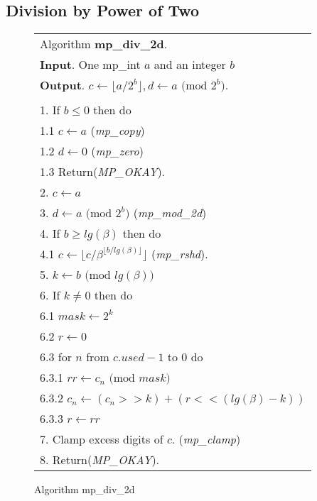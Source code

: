\documentclass[b5paper]{book}
\begin{document}
\subsection{Division by Power of Two}

\newpage\begin{figure}[!here]
\begin{small}
\begin{center}
\begin{tabular}{l}
\hline Algorithm \textbf{mp\_div\_2d}. \\
\textbf{Input}.   One mp\_int $a$ and an integer $b$ \\
\textbf{Output}.  $c \leftarrow \lfloor a / 2^b \rfloor, d \leftarrow a \mbox{ (mod }2^b\mbox{)}$. \\
\hline \\
1.  If $b \le 0$ then do \\
\hspace{3mm}1.1  $c \leftarrow a$ (\textit{mp\_copy}) \\
\hspace{3mm}1.2  $d \leftarrow 0$ (\textit{mp\_zero}) \\
\hspace{3mm}1.3  Return(\textit{MP\_OKAY}). \\
2.  $c \leftarrow a$ \\
3.  $d \leftarrow a \mbox{ (mod }2^b\mbox{)}$ (\textit{mp\_mod\_2d}) \\
4.  If $b \ge lg(\beta)$ then do \\
\hspace{3mm}4.1  $c \leftarrow \lfloor c/\beta^{\lfloor b/lg(\beta) \rfloor} \rfloor$ (\textit{mp\_rshd}). \\
5.  $k \leftarrow b \mbox{ (mod }lg(\beta)\mbox{)}$ \\
6.  If $k \ne 0$ then do \\
\hspace{3mm}6.1  $mask \leftarrow 2^k$ \\
\hspace{3mm}6.2  $r \leftarrow 0$ \\
\hspace{3mm}6.3  for $n$ from $c.used - 1$ to $0$ do \\
\hspace{6mm}6.3.1  $rr \leftarrow c_n \mbox{ (mod }mask\mbox{)}$ \\
\hspace{6mm}6.3.2  $c_n \leftarrow (c_n >> k) + (r << (lg(\beta) - k))$ \\
\hspace{6mm}6.3.3  $r \leftarrow rr$ \\
7.  Clamp excess digits of $c$.  (\textit{mp\_clamp}) \\
8.  Return(\textit{MP\_OKAY}). \\
\hline
\end{tabular}
\end{center}
\end{small}
\caption{Algorithm mp\_div\_2d}
\end{figure}
\end{document}
